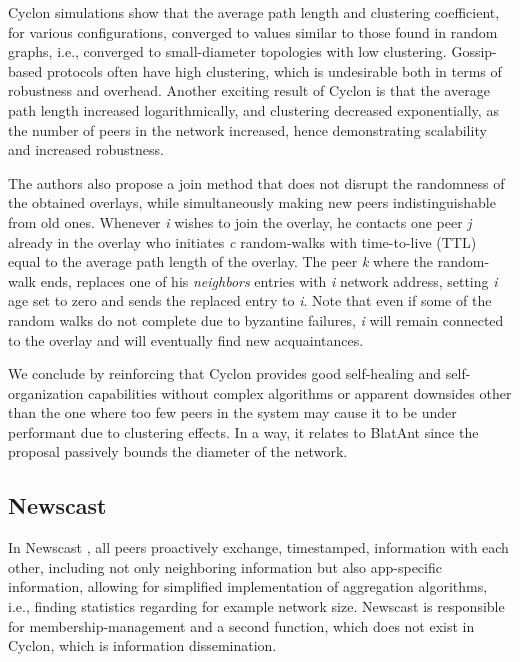 \documentclass[runningheads]{llncs}
\begin{document}
Cyclon simulations show that the average path length and clustering coefficient, for various configurations, converged to values similar to those found in random graphs, i.e., converged to small-diameter topologies with low clustering. Gossip-based protocols often have high clustering, which is undesirable both in terms of robustness and overhead. Another exciting result of Cyclon is that the average path length increased logarithmically, and clustering decreased exponentially, as the number of peers in the network increased, hence demonstrating scalability and increased robustness.

The authors also propose a join method that does not disrupt the randomness of the obtained overlays, while simultaneously making new peers indistinguishable from old ones. Whenever \textit{i} wishes to join the overlay, he contacts one peer \textit{j} already in the overlay who initiates \textit{c} random-walks with time-to-live (TTL) equal to the average path length of the overlay. The peer \textit{k} where the random-walk ends, replaces one of his \textit{neighbors} entries with \textit{i} network address, setting \textit{i} age set to zero and sends the replaced entry to \textit{i}. Note that even if some of the random walks do not complete due to byzantine failures, \textit{i} will remain connected to the overlay and will eventually find new acquaintances.

We conclude by reinforcing that Cyclon provides good self-healing and self-organization capabilities without complex algorithms or apparent downsides other than the one where too few peers in the system may cause it to be under performant due to clustering effects. In a way, it relates to BlatAnt since the proposal passively bounds the diameter of the network.

\subsection{Newscast}
In Newscast \cite{newscast-computing}, all peers proactively exchange, timestamped, information with each other, including not only neighboring information but also app-specific information, allowing for simplified implementation of aggregation algorithms, i.e., finding statistics regarding for example network size. Newscast is responsible for membership-management and a second function, which does not exist in Cyclon, which is information dissemination.
\end{document}
